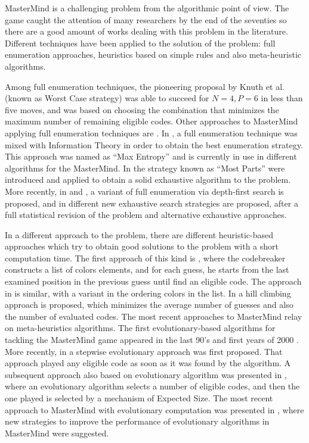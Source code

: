 MasterMind is a challenging problem from the algorithmic point of
view. The game caught the attention of many researchers by the end of
the seventies so there are a good amount of works dealing with this
problem in the literature. Different techniques have been applied to
the solution of the problem: full enumeration approaches, heuristics
based on simple rules and also meta-heuristic algorithms.

Among full enumeration techniques, the pioneering proposal by Knuth et
al. \cite{Knuth77} (known as Worst Case strategy) was able to
succeed for $N=4,P=6$ in less than five moves, and was based on choosing the
combination that minimizes the maximum number of remaining eligible
codes. Other approaches to MasterMind applying full enumeration
techniques are \cite{Irving79,Koyoma93}. In \cite{Bestavros86}, a full
enumeration technique was mixed with Information Theory in order to
obtain the best enumeration strategy. This approach was named as ``Max
Entropy'' and is currently in use in different algorithms for the
MasterMind. In \cite{Kooi05} the strategy known as ``Most Parts'' were
introduced and applied to obtain a solid exhaustive algorithm to the
problem. More recently, in \cite{Chen07} and \cite{Chen07b}, a variant
of full enumeration via depth-first search is proposed, and in
\cite{Merelo12} different new exhaustive search strategies are
proposed, after a full statistical revision of the problem and
alternative exhaustive approaches.

In a different approach to the problem, there are different heuristic-based approaches which try to
obtain good solutions to the problem with a short computation
time. The first approach of this kind is \cite{Shapiro83}, where the
codebreaker constructs a list of colors elements, and for each guess,
he starts from the last examined position in the previous guess until
find an eligible code. The approach in \cite{Swaszek00} is similar,
with a variant in the ordering colors in the list. In \cite{Kovacs03}
a hill climbing approach is proposed, which minimizes the average
number of guesses and also the number of evaluated codes. The most
recent approaches to MasterMind relay on meta-heuristics
algorithms. The first evolutionary-based algorithms for tackling the
MasterMind game appeared in the last 90's and first years of 2000
\cite{Bernier96,Bento99,Kalister03}. More recently, in \cite{Merelo06}
a stepwise evolutionary approach was first proposed. That approach
played any eligible code as soon as it was found by the algorithm. A
subsequent approach also based on evolutionary algorithm was presented
in \cite{Berghman09}, where an evolutionary algorithm selects a number
of eligible codes, and then the one played is selected by a mechanism
of Expected Size. The most recent approach to MasterMind with
evolutionary computation was presented in \cite{Maestro13}, where
new strategies to improve the performance of evolutionary algorithms
in MasterMind were suggested. 

